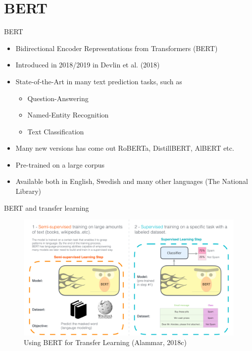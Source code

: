 \documentclass[10pt]{beamer}
\begin{document}

\section{BERT}
\frame{\sectionpage}

\begin{frame}{BERT}

\begin{itemize}
\item Bidirectional Encoder Representations from Transformers (BERT)
\item Introduced in 2018/2019 in Devlin et al. (2018)
\pause
\item {\color{uured} State-of-the-Art} in many text prediction tasks, such as
\begin{itemize}
\item Question-Answering
\item Named-Entity Recognition
\item Text Classification
\end{itemize}
\pause
\item Many new versions has come out RoBERTa, DistillBERT, AlBERT etc.
\pause
\item {\color{uured} Pre-trained} on a large corpus
\pause
\item Available both in English, Swedish and many other languages (The National Library)
\end{itemize}

\end{frame}


\begin{frame}{BERT and transfer learning}

\begin{figure}[h]
\centering
\includegraphics[width=1\textwidth]{fig/bert-transfer-learning.png}
\caption{Using BERT for Transfer Learning (Alammar, 2018c)}
\end{figure}

\end{frame}
\end{document}
